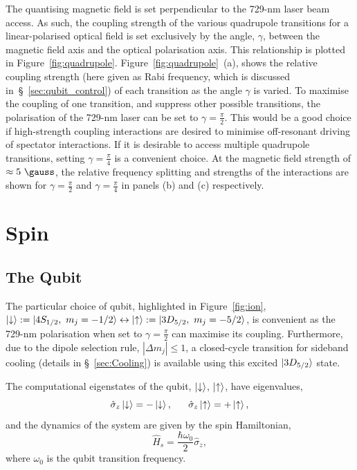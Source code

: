     The quantising magnetic field is set perpendicular to the 729-nm laser beam access. As such, the coupling strength of the various quadrupole transitions for a linear-polarised optical field is set exclusively by the angle, $\gamma$, between the magnetic field axis and the optical polarisation axis. This relationship is plotted in Figure~\ref{fig:quadrupole}.
    Figure~\ref{fig:quadrupole}~(a), shows the relative coupling strength
    (here given as Rabi frequency, which is discussed in~\S~\ref{sec:qubit_control}) of each transition as the angle $\gamma$ is varied.
    To maximise the coupling of one transition, and suppress other possible transitions, the polarisation of the 729-nm laser can be set to $\gamma = \frac{\pi}{2}$. This would be a good choice if high-strength coupling interactions are desired to minimise off-resonant driving of spectator interactions. If it is desirable to access multiple quadrupole transitions, setting $\gamma = \frac{\pi}{4}$ is a convenient choice.
    At the magnetic field strength of $\approx 5~\unit{\gauss}$, the relative frequency splitting and strengths of the interactions are shown for $\gamma = \frac{\pi}{2}$ and $\gamma=\frac{\pi}{4}$ in panels (b) and (c) respectively.



\section{Spin}
\subsection{The Qubit}

The particular choice of qubit, highlighted in Figure~\ref{fig:ion},
$\ket{\downarrow}:=\ket{4S_{1/2},~m_j = -1/2} \leftrightarrow \ket{\uparrow}:=\ket{3D_{5/2},~m_j = -5/2}$, is convenient as the 729-nm polarisation when set to $\gamma=\frac{\pi}{2}$ can maximise its coupling. Furthermore, due to the dipole selection rule, $|\Delta m_j| \leq 1$,
a closed-cycle transition for sideband cooling (details in \S~\ref{sec:Cooling}) is available using this excited $\ket{3D_{5/2}}$ state. 

The computational eigenstates of the qubit, $\ket{\downarrow}$, $\ket{\uparrow}$, have eigenvalues,
\begin{equation}
    \hat \sigma_z \ket{\downarrow} = -\ket{\downarrow},~~~~~\hat \sigma_z \ket{\uparrow} = +\ket{\uparrow},
\end{equation}
and the dynamics of the system are given by the spin Hamiltonian,
\begin{equation}
    \hat H_s = \frac{\hbar\omega_0}{2} \hat\sigma_z,
\end{equation}
where $\omega_0$ is the qubit transition frequency.

